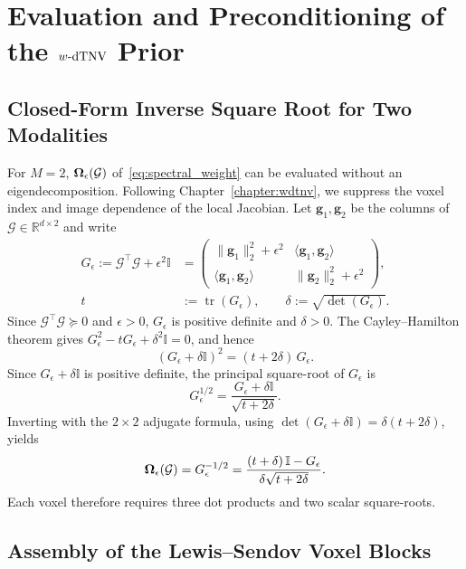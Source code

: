 \chapter{Evaluation and Preconditioning of the \texorpdfstring{$w\text{-}\mathrm{dTNV}$}{w-dTNV} Prior}
\label{app:wdtnv_details}

\section{Closed-Form Inverse Square Root for Two Modalities}
\label{app:inv_sqrt_2x2}

For $M=2$, $\bm{\Omega}_{\epsilon}\!\left(\mathcal{G}\right)$ of~\eqref{eq:spectral_weight} can be evaluated without an eigendecomposition. Following Chapter~\ref{chapter:wdtnv}, we suppress the voxel index and image dependence of the local Jacobian. Let $\bm{g}_1,\bm{g}_2$ be the columns of $\mathcal{G}\in\mathbb{R}^{d\times2}$ and write
\begin{equation}
    \begin{aligned}
    G_\epsilon:=\mathcal{G}^\top \mathcal{G}+\epsilon^2\mathbb{I}
    &=
    \begin{pmatrix}
    \|\bm{g}_1\|_2^2+\epsilon^2 & \langle \bm{g}_1,\bm{g}_2\rangle\\
    \langle \bm{g}_1,\bm{g}_2\rangle & \|\bm{g}_2\|_2^2+\epsilon^2
    \end{pmatrix},\\
    t&:=\operatorname{tr}(G_\epsilon),
    \qquad
    \delta:=\sqrt{\det(G_\epsilon)}.
    \end{aligned}
\end{equation}
Since $\mathcal{G}^\top \mathcal{G}\succeq0$ and $\epsilon>0$, $G_\epsilon$ is positive definite and $\delta>0$. The Cayley--Hamilton theorem gives $G_\epsilon^2-tG_\epsilon+\delta^2\mathbb{I}=0$, and hence
\[
(G_\epsilon+\delta\mathbb{I})^2=(t+2\delta)\,G_\epsilon.
\]
Since $G_\epsilon+\delta\mathbb{I}$ is positive definite, the principal square-root of $G_\epsilon$ is
\[
G_\epsilon^{1/2}=\frac{G_\epsilon+\delta\mathbb{I}}{\sqrt{t+2\delta}}.
\]
Inverting with the $2\times2$ adjugate formula, using $\det(G_\epsilon+\delta\mathbb{I})=\delta(t+2\delta)$, yields
\begin{equation}
    \bm{\Omega}_{\epsilon}\!\left(\mathcal{G}\right)
    =G_\epsilon^{-1/2}
    =\frac{(t+\delta)\,\mathbb{I}-G_\epsilon}{\delta\sqrt{t+2\delta}}.
    \label{eq:inv_sqrt_2x2}
\end{equation}
Each voxel therefore requires three dot products and two scalar square-roots.

\section{Assembly of the Lewis--Sendov Voxel Blocks}
\label{app:ls_block_assembly}

